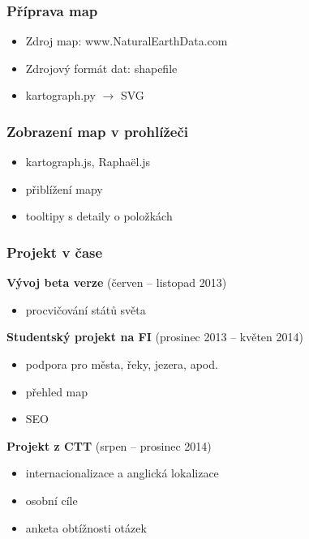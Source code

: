 \documentclass[xcolor=svgnames]{beamer}
\begin{document}
\begin{frame}
	\frametitle{Příprava map}
	\begin{itemize}
    \item Zdroj map: www.NaturalEarthData.com
    \item Zdrojový formát dat: shapefile
    \item kartograph.py $\rightarrow$ SVG
	\end{itemize}
\end{frame}
\begin{frame}
	\frametitle{Zobrazení map v prohlížeči}
	\begin{itemize}
    \item kartograph.js, Raphaël.js
    \item přiblížení mapy
    \item tooltipy s detaily o položkách
    \
	\end{itemize}
\end{frame}
\begin{frame}
	\frametitle{Projekt v čase}
     \textbf{Vývoj beta verze} (červen -- listopad 2013)
    \begin{itemize}
      \item procvičování států světa
    \end{itemize}
     \textbf{Studentský projekt na FI} (prosinec 2013 -- květen 2014)
    \begin{itemize}
      \item podpora pro města, řeky, jezera, apod.
      \item přehled map
      \item SEO
    \end{itemize}
     \textbf{Projekt z CTT} (srpen -- prosinec 2014)
    \begin{itemize}
      \item internacionalizace a anglická lokalizace
      \item osobní cíle
      \item anketa obtížnosti otázek
    \end{itemize}
\end{frame}
\end{document}
